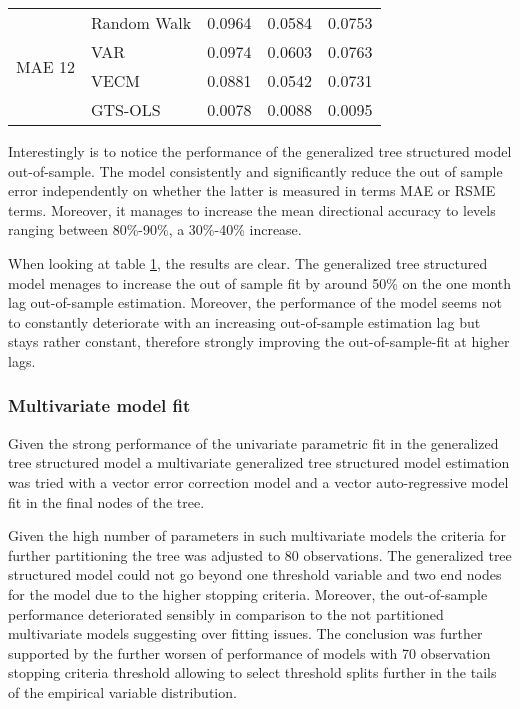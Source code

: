 \begin{table}[!h]
\begin{tabular}{llccc}
    \multirow{4}{*}{MAE 12}       & \multicolumn{1}{l}{Random Walk}             &   0.0964  & 0.0584  & 0.0753 \\
                                  & \multicolumn{1}{l}{VAR}                     &   0.0974  & 0.0603  & 0.0763 \\
                                  & \multicolumn{1}{l}{VECM}                    &   0.0881  & 0.0542  & 0.0731 \\
                                  & \multicolumn{1}{l}{GTS-OLS}                 &   0.0078  & 0.0088  & 0.0095 \\    
    \bottomrule
  \end{tabular}
  \label{table:GTS-OLS fit}
  \vspace{1em}  
\end{table}

Interestingly is to notice the performance of the generalized tree
structured model out-of-sample. The model consistently and
significantly reduce the out of sample error independently on whether
the latter is measured in terms MAE or RSME terms. Moreover, it
manages to increase the mean directional accuracy to levels ranging
between 80\%-90\%, a 30\%-40\% increase.

When looking at table \ref{table:GTS-OLS fit}, the results are
clear. The generalized tree structured model menages to increase the
out of sample fit by around 50\% on the one month lag out-of-sample
estimation. Moreover, the performance of the model seems not to
constantly deteriorate with an increasing out-of-sample estimation lag
but stays rather constant, therefore strongly improving the
out-of-sample-fit at higher lags.


\subsubsection{Multivariate model fit}

Given the strong performance of the univariate parametric fit in the
generalized tree structured model a multivariate generalized tree
structured model estimation was tried with a vector error correction
model and a vector auto-regressive model fit in the final nodes of the
tree.

Given the high number of parameters in such multivariate models the
criteria for further partitioning the tree was adjusted to 80
observations. The generalized tree structured model could not go
beyond one threshold variable and two end nodes for the model due to
the higher stopping criteria. Moreover, the out-of-sample performance
deteriorated sensibly in comparison to the not partitioned
multivariate models suggesting over fitting issues. The conclusion was
further supported by the further worsen of performance of models with
70 observation stopping criteria threshold allowing to select
threshold splits further in the tails of the empirical variable
distribution.

